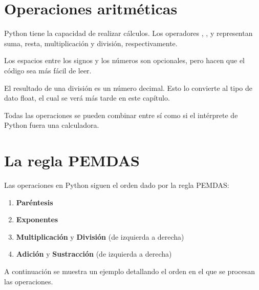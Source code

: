 
\section{Operaciones aritméticas}

Python tiene la capacidad de realizar cálculos.
Los operadores \ttt{+}, \ttt{-}, \ttt{*} y \ttt{/} representan suma, resta, multiplicación y división, respectivamente.


Los espacios entre los signos y los números son opcionales, pero hacen que el código sea más fácil de leer.
\medskip

El resultado de una división es un número decimal.
Esto lo convierte al tipo de dato float, el cual se verá más tarde en este capítulo.


Todas las operaciones se pueden combinar entre sí como si el intérprete de Python fuera una calculadora.


\section{La regla PEMDAS}

Las operaciones en Python siguen el orden dado por la regla PEMDAS:

\begin{enumerate}
  \item \textbf{Paréntesis} \ttt{()}
  
  \item \textbf{Exponentes} \ttt{**}
  
  \item \textbf{Multiplicación} \ttt{*} y \textbf{División} \ttt{/} (de izquierda a derecha)
  
  \item \textbf{Adición} \ttt{+} y \textbf{Sustracción} \ttt{-} (de izquierda a derecha)
  
\end{enumerate}

A continuación se muestra un ejemplo detallando el orden en el que se procesan las operaciones.

